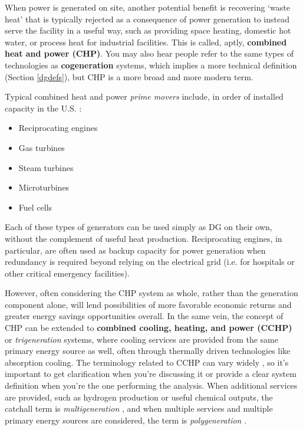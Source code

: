 \documentclass[10pt]{article}
\begin{document}
When power is generated on site, another potential benefit is recovering `waste heat' that is typically rejected as a consequence of power generation to instead serve the facility in a useful way, such as providing space heating, domestic hot water, or process heat for industrial facilities. This is called, aptly, \textbf{combined heat and power (CHP)}. You may also hear people refer to the same types of technologies as \textbf{cogeneration} systems, which implies a more technical definition (Section \ref{dgdefs}), but CHP is a more broad and more modern term.

Typical combined heat and power \textit{prime movers} include, in order of installed capacity in the U.S. \cite{Combined_Heat_and_Power_Partnership2017-rd}:

\vspace{-6pt}
\begin{itemize}
    \setlength{\itemsep}{0pt}%
    \setlength{\parskip}{0pt}%
    \item Reciprocating engines
    \item Gas turbines
    \item Steam turbines
    \item Microturbines
    \item Fuel cells
\end{itemize}
\vspace{-6pt}

Each of these types of generators can be used simply as DG on their own, without the complement of useful heat production. Reciprocating engines, in particular, are often used as backup capacity for power generation when redundancy is required beyond relying on the electrical grid (i.e. for hospitals or other critical emergency facilities). 

However, often considering the CHP system as  whole, rather than the generation component alone, will lend possibilities of more favorable economic returns and greater energy savings opportunities overall. In the same vein, the concept of CHP can be extended to \textbf{combined cooling, heating, and power (CCHP)} or \textit{trigeneration} systems, where cooling services are provided from the same primary energy source as well, often through thermally driven technologies like absorption cooling. The terminology related to CCHP can vary widely \cite{Cho2014-os}, so it's important to get clarification when you're discussing it or provide a clear system definition when you're the one performing the analysis. When additional services are provided, such as hydrogen production or useful chemical outputs, the catchall term is \textit{multigeneration} \cite{Chicco2009-go}{\color{blue}, and when multiple services and multiple primary energy sources are considered, the term is \textit{polygeneration} \cite{Rong2017-tx}}.
\end{document}

